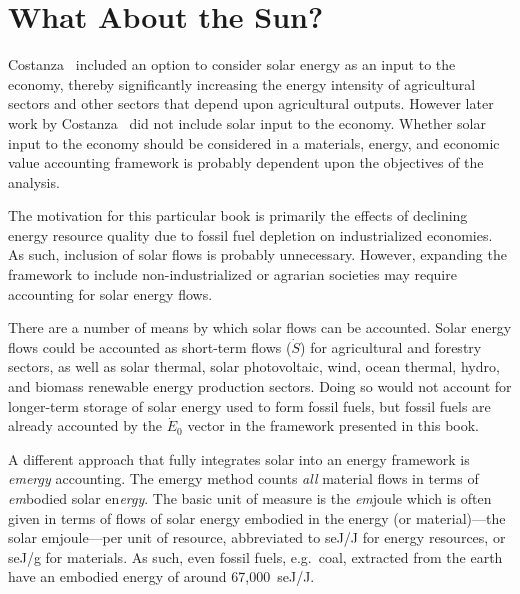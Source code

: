 \section{What About the Sun?}

Costanza~\cite{Costanza:1978vd} included an option to consider 
solar energy as an input to the economy, 
thereby significantly increasing the energy intensity 
of agricultural sectors and other sectors 
that depend upon agricultural outputs. 
However later work by Costanza~\cite{Costanza:1984tq,Costanza:1980ww} 
did not include solar input to the economy.
Whether solar input to the economy 
should be considered in a materials, energy, and economic value 
accounting framework is probably dependent upon 
the objectives of the analysis. 

The motivation for this particular book is primarily 
the effects of declining energy resource quality
due to fossil fuel depletion on industrialized economies. 
As such, inclusion of solar flows is probably unnecessary. 
However, expanding the framework to include non-industrialized 
or agrarian societies may require accounting for solar energy flows. 

There are a number of means by which solar flows can be accounted. 
Solar energy flows could be accounted as short-term flows ($\dot{S}$)
for agricultural and forestry sectors, 
as well as 
solar thermal, 
solar photovoltaic, 
wind, 
ocean thermal, 
hydro, and
biomass
renewable energy
production sectors.
Doing so would not account for longer-term storage
of solar energy used to form fossil fuels, 
but fossil fuels are already accounted by the $\dot{E}_{0}$ vector
in the framework presented in this book.

A different approach that fully integrates solar 
into an energy framework is \emph{emergy} accounting.
The emergy method counts \emph{all} material flows 
in terms of \emph{em}bodied solar en\emph{ergy}.\cite{Odum1975, Odum1996}
The basic unit of measure is 
the \emph{em}joule which is often given in terms 
of flows of solar energy embodied in 
the energy (or material)---the solar emjoule---per unit of resource, 
abbreviated to seJ/J for energy resources, 
or seJ/g for materials. 
As such, even fossil fuels, e.g.\ coal, 
extracted from the earth have an embodied energy 
of around 67,000~seJ/J.\cite{Brown2004} 


